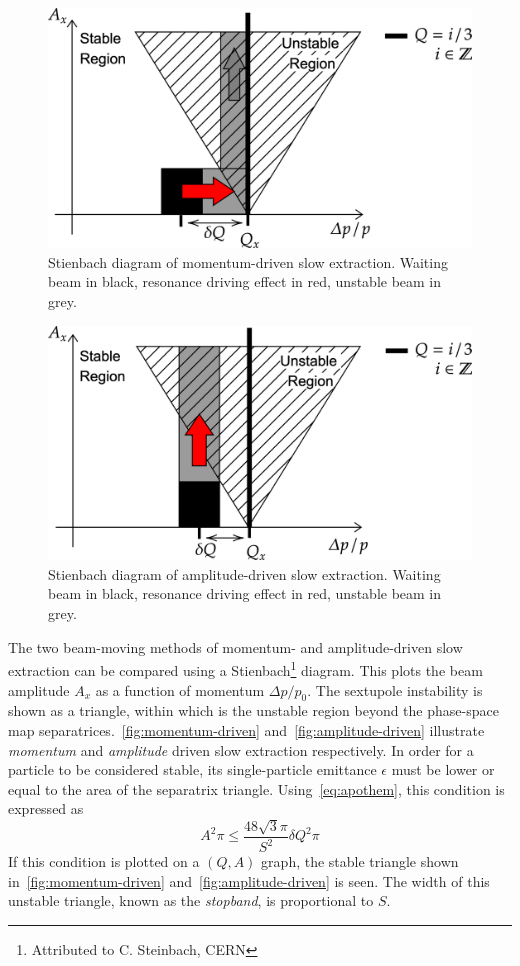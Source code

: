 \documentclass[11pt]{report}
\begin{document}
\begin{figure}[ht]
  \centering
  \includegraphics[width=0.6\linewidth]{momentum-driven.png}
  \caption{Stienbach diagram of momentum-driven slow extraction. Waiting beam in black, resonance driving effect in red, unstable beam in grey.}\label{fig:momentum-driven}
\end{figure}

\begin{figure}[ht]
  \centering
  \includegraphics[width=0.6\linewidth]{amplitude-driven.png}
  \caption{Stienbach diagram of amplitude-driven slow extraction. Waiting beam in black, resonance driving effect in red, unstable beam in grey.}\label{fig:amplitude-driven}
\end{figure}

The two beam-moving methods of momentum- and amplitude-driven slow extraction can be compared using a Stienbach\footnote{Attributed to C. Steinbach, CERN} diagram. This plots the beam amplitude $A_x$ as a function of momentum $\Delta p/p_0$. The sextupole instability is shown as a triangle, within which is the unstable region beyond the phase-space map separatrices.~\autoref{fig:momentum-driven} and~\autoref{fig:amplitude-driven} illustrate \textit{momentum} and \textit{amplitude} driven slow extraction respectively.
In order for a particle to be considered stable, its single-particle emittance $\epsilon$ must be lower or equal to the area of the separatrix triangle. Using~\autoref{eq:apothem}, this condition is expressed as
\begin{equation}
  A^2\pi\le\frac{48\sqrt 3\pi}{S^2}\delta Q^2\pi
  \label{eq:steinbach}
\end{equation} 
If this condition is plotted on a $(Q, A)$ graph, the stable triangle shown in~\autoref{fig:momentum-driven} and~\autoref{fig:amplitude-driven} is seen. The width of this unstable triangle, known as the \textit{stopband}, is proportional to $S$.
\end{document}
